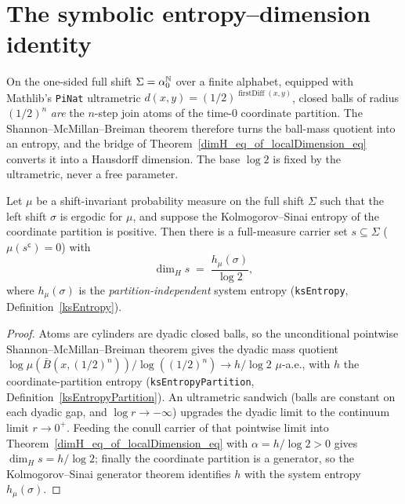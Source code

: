 \section{The symbolic entropy--dimension identity}

On the one-sided full shift \(\Sigma = \alpha_0^{\mathbb{N}}\) over a finite alphabet, equipped with
Mathlib's \texttt{PiNat} ultrametric \(d(x,y) = (1/2)^{\operatorname{firstDiff}(x,y)}\), closed
balls of radius \((1/2)^n\) \emph{are} the \(n\)-step join atoms of the time-\(0\) coordinate
partition. The Shannon--McMillan--Breiman theorem therefore turns the ball-mass quotient into an
entropy, and the bridge of Theorem~\ref{dimH_eq_of_localDimension_eq} converts it into a Hausdorff
dimension. The base \(\log 2\) is fixed by the ultrametric, never a free parameter.

\begin{theorem}[Entropy = Hausdorff dimension on the full shift]\label{dimH_eq_ksEntropy_div_log_two}
  \leanok
  Let \(\mu\) be a shift-invariant probability measure on the full shift \(\Sigma\) such that the
  left shift \(\sigma\) is ergodic for \(\mu\), and suppose the Kolmogorov--Sinai entropy of the
  coordinate partition is positive. Then there is a full-measure carrier set
  \(s \subseteq \Sigma\) (\(\mu(s^{\mathsf c}) = 0\)) with
  \[
    \dim_H s \;=\; \frac{h_\mu(\sigma)}{\log 2},
  \]
  where \(h_\mu(\sigma)\) is the \emph{partition-independent} system entropy
  (\texttt{ksEntropy}, Definition~\ref{ksEntropy}).
\end{theorem}
\begin{proof}\leanok
  Atoms are cylinders are dyadic closed balls, so the unconditional pointwise
  Shannon--McMillan--Breiman theorem gives the dyadic mass quotient
  \(\log\mu(\bar B(x,(1/2)^n)) / \log((1/2)^n) \to h/\log 2\) \(\mu\)-a.e., with \(h\) the
  coordinate-partition entropy (\texttt{ksEntropyPartition},
  Definition~\ref{ksEntropyPartition}). An ultrametric sandwich (balls are constant on each dyadic
  gap, and \(\log r \to -\infty\)) upgrades the dyadic limit to the continuum limit
  \(r \to 0^+\). Feeding the conull carrier of that pointwise limit into
  Theorem~\ref{dimH_eq_of_localDimension_eq} with \(\alpha = h/\log 2 > 0\) gives
  \(\dim_H s = h / \log 2\); finally the coordinate partition is a generator, so the
  Kolmogorov--Sinai generator theorem identifies \(h\) with the system entropy
  \(h_\mu(\sigma)\).
\end{proof}

